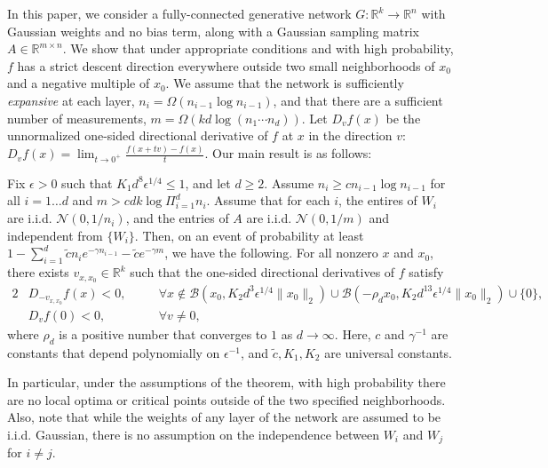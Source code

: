 \documentclass[final,12pt]{colt2018}
\newcommand{\ctilde}{\tilde{c}}
\newcommand{\R}{\mathbb{R}}
\newcommand{\calB}{\mathcal{B}}
\newcommand{\eps}{\epsilon}
\newcommand{\zetacheck}{\rho}
\newcommand{\xo}{x_0}
\newcommand{\vxxo}{v_{x, \xo}}
\begin{document}
In this paper, we consider a fully-connected generative network $G:\R^k \to \R^n$ with Gaussian weights and no bias term, along with a Gaussian sampling matrix $A \in \R^{m \times n}$.  We show that under appropriate conditions and with high probability, $f$ has a strict descent direction everywhere outside two small neighborhoods of $\xo$ and a negative multiple of $\xo$.  We assume that the network is sufficiently \textit{expansive} at each layer, $n_i = \Omega(n_{i-1} \log n_{i-1})$, and that there are a sufficient number of measurements, $m = \Omega(k d \log (n_1 \cdots n_d))$.  Let $D_v f(x)$ be the unnormalized one-sided directional derivative of $f$ at $x$ in the direction $v$: $D_v f(x) = \lim_{t \to 0^+} \frac{f(x + t v) - f(x)}{t}$.  Our main result is as follows:
  
\begin{theorem} \label{thm-multi-layer-XX}
Fix $\eps >0$ such that $K_1 d^8 \eps^{1/4} \leq 1$, and let $d \geq 2$.  Assume $n_i \geq c n_{i-1} \log n_{i-1}$ for all $i = 1 \ldots d$ and $m > c d  k \log \Pi_{i=1}^d n_i$.  Assume that for each $i$, the entires of $W_i$ are i.i.d. $\mathcal{N}(0, 1/n_i)$, and the entries of $A$ are i.i.d. $\mathcal{N}(0, 1/m)$ and independent from $\{W_i\}$.
Then, on an event of probability at least $1 -  \sum_{i=1}^d \ctilde n_i e^{-\gamma n_{i-1} }- \ctilde e^{-\gamma m}$, we have the following. For all nonzero $x$ and $\xo$, there exists $\vxxo \in \R^k$ such that the one-sided directional derivatives of $f$ satisfy
\begin{alignat*}{2}
&D_{-\vxxo} f(x) <0, \quad & & \forall x  \not\in  \calB(\xo, K_2 d^{3} \eps^{1/4} \|\xo\|_2) \cup \calB(-\zetacheck_d \xo, K_2 d^{13} \eps^{1/4} \|\xo\|_2) \cup \{0\},\\
&D_v f(0) < 0, & &\forall v \neq 0,
\end{alignat*}
where $\rho_d$ is a positive number that converges to $1$ as $d \to \infty$.
  Here, $c$ and $\gamma^{-1}$ are constants that depend polynomially on $\eps^{-1}$, and $\ctilde, K_1, K_2$ are universal constants.
\end{theorem}
In particular, under the assumptions of the theorem, with high probability there are no local optima or critical points outside of the two specified neighborhoods.  Also, note that while the weights of any layer of the network are assumed to be i.i.d. Gaussian, there is no assumption on the independence between $W_i$ and $W_j$ for $i \neq j$.
\end{document}
